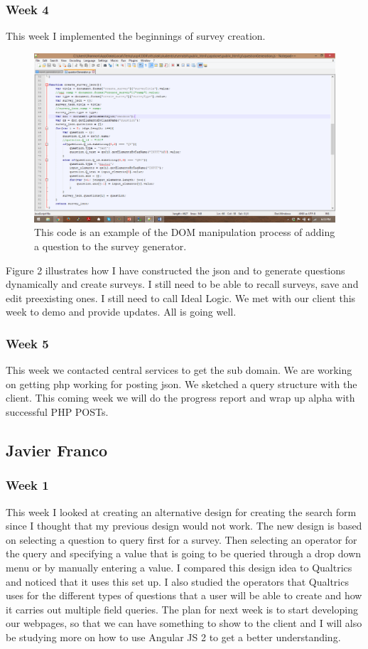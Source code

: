 \documentclass[letterpaper,10pt,serif, draftclsnofoot,onecolumn, compsoc, titlepage]{IEEEtran}
\begin{document}
\subsubsection{Week 4}
This week I implemented the beginnings of survey creation.
\begin{figure}
\includegraphics[scale=.5, width=\textwidth]{code_snippet_2.png}
\caption{This code is an example of the DOM manipulation process of adding a question to the survey generator.}
\label{fig:code2}
\end{figure}
Figure 2 illustrates how I have constructed the json and to generate questions dynamically and create surveys.
I still need to be able to recall surveys, save and edit preexisting ones.
I still need to call Ideal Logic. We met with our client this week to demo and provide updates.
All is going well.
\subsubsection{Week 5}
This week we contacted central services to get the sub domain.
We are working on getting php working for posting json.
We sketched a query structure with the client.
This coming week we will do the progress report and wrap up alpha with successful PHP POSTs.

\subsection{Javier Franco}
\subsubsection{Week 1}
This week I looked at creating an alternative design for creating the search form since I thought that my previous design would not work.
The new design is based on selecting a question to query first for a survey.
Then selecting an operator for the query and specifying a value that is going to be queried through a drop down menu or by manually entering a value.
I compared this design idea to Qualtrics and noticed that it uses this set up.
I also studied the operators that Qualtrics uses for the different types of questions that a user will be able to create and how it carries out multiple field queries.
The plan for next week is to start developing our webpages, so that we can have something to show to the client and I will also be studying more on how to use Angular JS 2 to get a better understanding.
\end{document}
